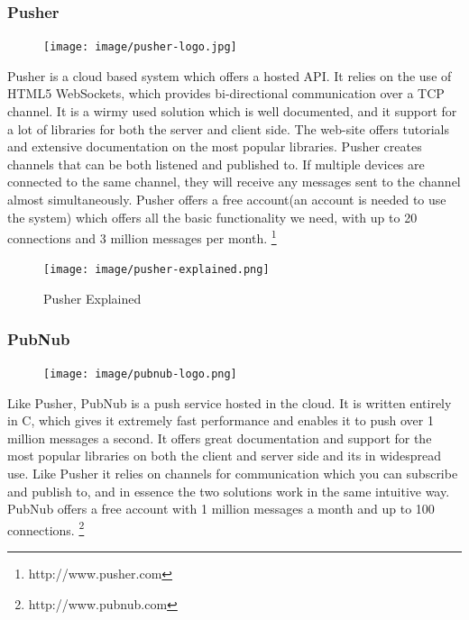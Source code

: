 \subsubsection{Pusher}

\begin{figure}
\centering
\texttt{[image: image/pusher-logo.jpg]}
\end{figure}

Pusher is a cloud based system which offers a hosted API. It relies on the use of HTML5 WebSockets, which provides bi-directional communication over a TCP channel. It is a wirmy used solution which is well documented, and it support for a lot of libraries for both the server and client side. The web-site offers tutorials and extensive documentation on the most popular libraries. Pusher creates channels that can be both listened and published to. If multiple devices are connected to the same channel, they will receive any messages sent to the channel almost simultaneously. Pusher offers a free account(an account is needed to use the system) which offers all the basic functionality we need, with up to 20 connections and 3 million messages per month.
\footnote{http://www.pusher.com}

\begin{figure}
\centering
\texttt{[image: image/pusher-explained.png]}
\caption{Pusher Explained}
\end{figure}

\subsubsection{PubNub}

\begin{figure}
\centering
\texttt{[image: image/pubnub-logo.png]}
\end{figure}

Like Pusher, PubNub is a push service hosted in the cloud. It is written entirely in C, which gives it extremely fast performance and enables it to push over 1 million messages a second. It offers great documentation and support for the most popular libraries on both the client and server side and its in widespread use. Like Pusher it relies on channels for communication which you can subscribe and publish to, and in essence the two solutions work in the same intuitive way. PubNub offers a free account with 1 million messages a month and up to 100 connections.
\footnote{http://www.pubnub.com}

